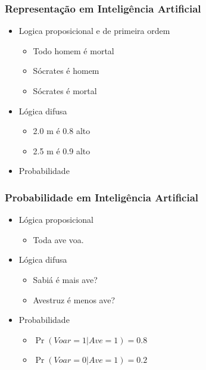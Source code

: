 \documentclass[10pt]{beamer}
\theoremstyle{plain}
\newcommand{\p}{\pause}
\begin{document}
\begin{frame}
  \frametitle{Representação em Inteligência Artificial}
  \begin{itemize}
    \item Logica proposicional e de primeira ordem\p
      \begin{itemize}
        \item Todo homem é mortal\p
        \item Sócrates é homem\p
        \item Sócrates é mortal\p
      \end{itemize}
    \item Lógica difusa\p
      \begin{itemize}
        \item 2.0 m é 0.8 alto\p
        \item 2.5 m é 0.9 alto\p
      \end{itemize}
    \item Probabilidade
  \end{itemize}
\end{frame}

\begin{frame}
  \frametitle{Probabilidade em Inteligência Artificial}

  \begin{itemize}
    \item Lógica proposicional
      \begin{itemize}
        \item Toda ave voa.\p
      \end{itemize}
    \item Lógica difusa
      \begin{itemize}
        \item Sabiá é mais ave?
        \item Avestruz é menos ave?\p
      \end{itemize}
    \item Probabilidade
      \begin{itemize}
        \item $\Pr(Voar=1|Ave=1)=0.8$
        \item $\Pr(Voar=0|Ave=1)=0.2$
      \end{itemize}
  \end{itemize}
\end{frame}

\end{document}
